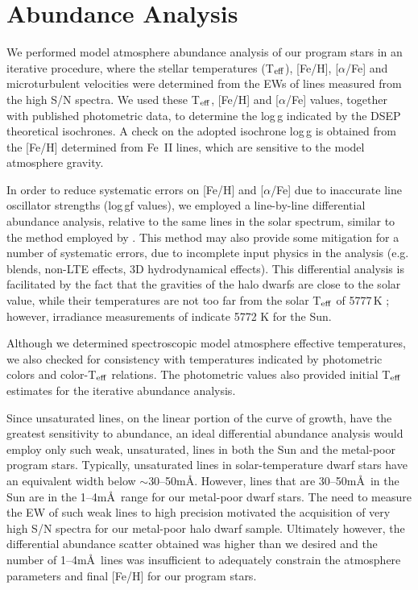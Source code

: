 \documentclass[revtex4]{emulateapj}
\begin{document}
\section{Abundance Analysis \label{sec:Abund}}
We performed model atmosphere abundance analysis of our program stars in an iterative procedure, where the stellar temperatures (T$_{\rm eff}$), [Fe/H], [$\alpha$/Fe] and microturbulent velocities were determined from the EWs of lines measured from the high S/N spectra.  We used these T$_{\rm eff}$, [Fe/H] and [$\alpha$/Fe]  values, together with published photometric data, to determine the log\,g indicated by the DSEP theoretical isochrones.  A check on the adopted isochrone log\,g is obtained from the [Fe/H] determined from Fe~II lines, which are sensitive to the model atmosphere gravity.

In order to reduce systematic errors on [Fe/H] and [$\alpha$/Fe] due to inaccurate line oscillator strengths (log\,gf values), we employed a line-by-line differential abundance analysis, relative to the same lines in the solar spectrum, similar to the method employed by \citet{KM2008}.  This method may also provide some mitigation for a number of systematic errors, due to incomplete input physics in the analysis (e.g. blends, non-LTE effects, 3D hydrodynamical effects).  This differential analysis is facilitated by the fact that the gravities of the halo dwarfs are close to the solar value, while their temperatures are not too far from the solar T$_{\rm eff}$ of 5777\,K \citep[e.g.][]{AQ2000}; however, irradiance measurements of \citet{KL2011} indicate 5772 K for the Sun.

Although we determined spectroscopic model atmosphere effective temperatures, we also checked for consistency with temperatures indicated by photometric colors and color-T$_{\rm eff}$ relations.  The photometric values also provided initial T$_{\rm eff}$ estimates for the iterative abundance analysis.

Since unsaturated lines, on the linear portion of the curve of growth, have the greatest sensitivity to abundance, an ideal differential abundance analysis would employ only such weak, unsaturated, lines in both the Sun and the metal-poor program stars.  Typically, unsaturated lines in solar-temperature dwarf stars have an equivalent width below $\sim$30--50m\AA.  However, lines that are 30--50m\AA\ in the Sun are in the 1--4m\AA\ range for our metal-poor dwarf stars.  The need to measure the EW of such weak lines to high precision motivated the acquisition of very high S/N spectra for our metal-poor halo dwarf sample.  Ultimately however, the differential abundance scatter obtained was higher than we desired and the number of 1--4m\AA\ lines was insufficient to adequately constrain the atmosphere parameters and final [Fe/H] for our program stars.  
\end{document}
